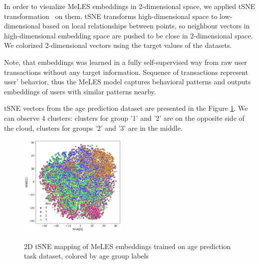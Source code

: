 \documentclass[sigconf, anonymous]{acmart}
\begin{document}
In order to visualize MeLES embeddings in 2-dimensional space, we applied tSNE transformation~\cite{maaten2008visualizing} on them. tSNE transforms high-dimensional space to low-dimensional based on local relationships between points, so neighbour vectors in high-dimensional embedding space are pushed to be close in 2-dimensional space. We colorized 2-dimensional vectors using the target values of the datasets.

Note, that embeddings was learned in a fully self-supervised way from raw user transactions without any target information. Sequence of transactions represent user' behavior, thus the MeLES model captures behavioral patterns and outputs embeddings of users with similar patterns nearby.

tSNE vectors from the age prediction dataset are presented in the Figure \ref{fig-tsne-age}. We can observe 4 clusters: clusters for group '1' and '2' are on the opposite side of the cloud, clusters for groups '2' and '3' are in the middle.



\begin{figure}[ht]
  \caption{2D tSNE mapping of MeLES embeddings trained on age prediction task dataset, colored by age group labels}
  \includegraphics[width=0.46\textwidth]{figures/age-pred-tsne.png}
  \label{fig-tsne-age}
\end{figure}

\end{document}
